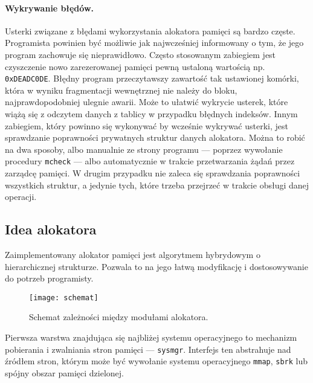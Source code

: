 \documentclass[12pt,a4paper,titlepage,twoside]{mwart}
\begin{document}
\paragraph{Wykrywanie błędów.} Usterki związane z błędami wykorzystania
alokatora pamięci są bardzo częste. Programista powinien być możliwie jak
najwcześniej informowany o tym, że jego program zachowuje się nieprawidłowo.
Często stosowanym zabiegiem jest czyszczenie nowo zarezerowanej pamięci pewną
ustaloną wartością np. \texttt{0xDEADC0DE}. Błędny program przeczytawszy
zawartość tak ustawionej komórki, która w wyniku fragmentacji wewnętrznej nie
należy do bloku, najprawdopodobniej ulegnie awarii. Może to ułatwić wykrycie
usterek, które wiążą się z odczytem danych z tablicy w przypadku błędnych
indeksów. Innym zabiegiem, który powinno się wykonywać by wcześnie wykrywać
usterki, jest sprawdzanie poprawności prywatnych struktur danych alokatora.
Można to robić na dwa sposoby, albo manualnie ze strony programu --- poprzez
wywołanie procedury \texttt{mcheck} --- albo automatycznie w trakcie
przetwarzania żądań przez zarządcę pamięci. W drugim przypadku nie zaleca się
sprawdzania poprawności wszystkich struktur, a jedynie tych, które trzeba
przejrzeć w trakcie obsługi danej operacji.

\subsection{Idea alokatora}

Zaimplementowany alokator pamięci jest algorytmem hybrydowym o hierarchicznej
strukturze. Pozwala to na jego łatwą modyfikację i dostosowywanie do potrzeb
programisty.

\begin{figure}[ht]
\centering
\texttt{[image: schemat]}
\caption{Schemat zależności między modułami alokatora.}
\end{figure}

Pierwsza warstwa znajdująca się najbliżej systemu operacyjnego to mechanizm
pobierania i zwalniania stron pamięci --- \texttt{sysmgr}. Interfejs ten
abstrahuje nad źródłem stron, którym może być wywołanie systemu operacyjnego
\texttt{mmap}, \texttt{sbrk} lub spójny obszar pamięci dzielonej.
\end{document}
